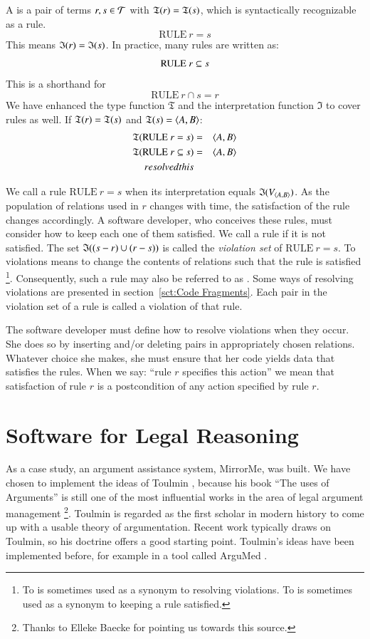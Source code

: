 \documentclass{elsarticle}
\begin{document}
	A  is a pair of terms $r,s\in\mathcal{T}$ with $\mathfrak{T}(r)=\mathfrak{T}(s)$, which is syntactically recognizable as a rule.
\[\text{RULE}\ r = s\]
	This means \(\mathfrak{I}(r) = \mathfrak{I}(s)\). In practice, many rules are written as:
\[\text{RULE}\ r\subseteq s\]
	This is a shorthand for 
\[\text{RULE}\ r\cap s = r\]
	We have enhanced the type function $\mathfrak{T}$ and the interpretation function $\mathfrak{I}$ to cover rules as well.
	If $\mathfrak{T}(r)=\mathfrak{T}(s)$ and $\mathfrak{T}(s)=\langle{A},{B}\rangle$:
\begin{eqnarray}
	\mathfrak{T}(\text{RULE}\ r = s)   &=&\langle{A},{B}\rangle\\
	\mathfrak{T}(\text{RULE}\ r\subseteq s)&=&\langle{A},{B}\rangle\\
 resolved this \end{eqnarray}

	We call a rule $\text{RULE}\ r = s$  when its interpretation equals $\mathfrak{I}(V_{\langle{A},{B}\rangle})$.
	As the population of relations used in $r$ changes with time, the satisfaction of the rule changes accordingly.
	A software developer, who conceives these rules, must consider how to keep each one of them satisfied.
	We call a rule  if it is not satisfied.
	The set $\mathfrak{I}((s-r)\cup(r-s))$ is called the \emph{violation set} of \(\text{RULE}\ r = s\).
	To  violations means to change the contents of relations such that the rule is satisfied%
\footnote{To  is sometimes used as a synonym to resolving violations.
	To  is sometimes used as a synonym to keeping a rule satisfied.}.
	Consequently, such a rule may also be referred to as .
	Some ways of resolving violations are presented in section~\ref{sct:Code Fragments}.
	Each pair in the violation set of a rule is called a violation of that rule.

	The software developer must define how to resolve violations when they occur.
	She does so by inserting and/or deleting pairs in appropriately chosen relations.
	Whatever choice she makes, she must ensure that her code yields data that satisfies the rules.
	When we say: ``rule $r$ specifies this action'' we mean that satisfaction of rule $r$ is a postcondition of any action specified by rule $r$. 

\section{Software for Legal Reasoning}
\label{sct:Conceptual analysis}
	As a case study, an argument assistance system, MirrorMe, was built.
	We have chosen to implement the ideas of Toulmin \cite{Toulmin1958},
	because his book ``The uses of Arguments'' is still one of the most influential works in the area of legal argument management%
\footnote{Thanks to Elleke Baecke for pointing us towards this source.}.
	Toulmin is regarded as the first scholar in modern history to come up with a usable theory of argumentation.
	Recent work typically draws on Toulmin, so his doctrine offers a good starting point.
	Toulmin's ideas have been implemented before, for example in a tool called ArguMed \cite{Verheij1999}.
\end{document}
